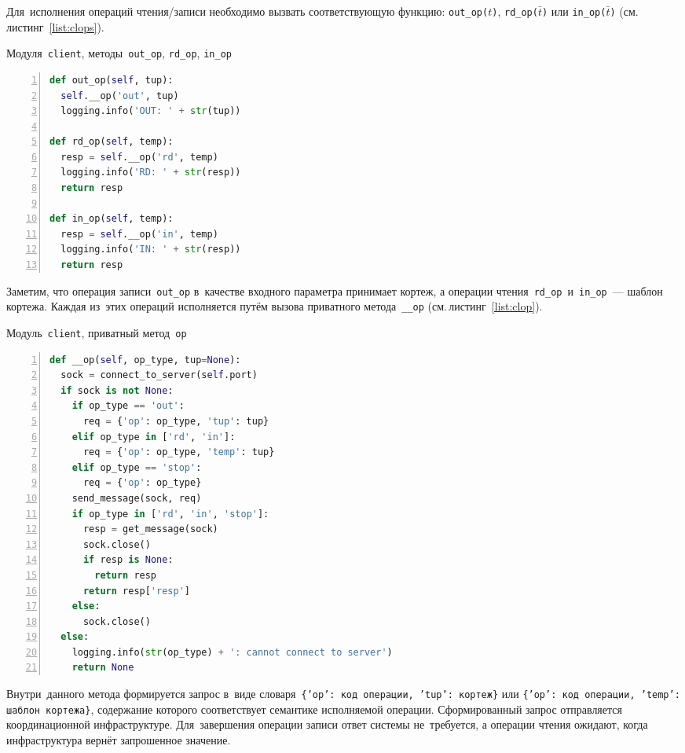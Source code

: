 Для~исполнения операций чтения/записи необходимо вызвать соответствующую функцию: \texttt{out_op($t$)}, \texttt{rd_op($\bar t$)} или \texttt{in_op($\bar t$)} (см.\,листинг~\ref{list:clops}).
\begin{ListingEnv}[H]\caption{Модуля~\texttt{client}, методы~\texttt{out\_op}, \texttt{rd\_op}, \texttt{in\_op}}\label{list:clops}
	\begin{lstlisting}[language=Python, numbers=left]
def out_op(self, tup):
  self.__op('out', tup)
  logging.info('OUT: ' + str(tup))

def rd_op(self, temp):
  resp = self.__op('rd', temp)
  logging.info('RD: ' + str(resp))
  return resp

def in_op(self, temp):
  resp = self.__op('in', temp)
  logging.info('IN: ' + str(resp))
  return resp
\end{lstlisting}
\end{ListingEnv}
Заметим, что операция записи~\texttt{out_op} в~качестве входного параметра принимает кортеж, а операции чтения~\texttt{rd_op}~и~\texttt{in_op}~--- шаблон кортежа. Каждая из~этих операций исполняется путём вызова приватного метода~\texttt{\_\_op} (см.\,листинг~\ref{list:clop}).
\begin{ListingEnv}\caption{Модуль~\texttt{client}, приватный метод~\texttt{op}}\label{list:clop}
	\begin{lstlisting}[language=Python, numbers=left]
def __op(self, op_type, tup=None):
  sock = connect_to_server(self.port)
  if sock is not None:
    if op_type == 'out':
      req = {'op': op_type, 'tup': tup}
    elif op_type in ['rd', 'in']:
      req = {'op': op_type, 'temp': tup}
    elif op_type == 'stop':
      req = {'op': op_type}
    send_message(sock, req)
    if op_type in ['rd', 'in', 'stop']:
      resp = get_message(sock)
      sock.close()
      if resp is None:
        return resp
      return resp['resp']
    else:
      sock.close()
  else:
    logging.info(str(op_type) + ': cannot connect to server')
    return None
	\end{lstlisting}
\end{ListingEnv}
Внутри~данного метода формируется запрос в~виде словаря~\texttt{\{'op': код операции, 'tup': кортеж\}} или \texttt{\{'op': код операции, 'temp': шаблон кортежа\}}, содержание которого соответствует семантике исполняемой операции. Сформированный запрос отправляется координационной инфраструктуре. Для~завершения операции записи ответ системы не~требуется, а операции чтения ожидают, когда инфраструктура вернёт запрошенное значение.

